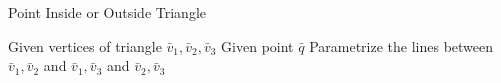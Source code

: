 \documentclass[a4paper,10pt]{scrartcl}
\begin{document}
    
\begin{algorithm}
  \caption{Point Inside or Outside Triangle}\label{}
  \begin{algorithmic}

    \State Given vertices of triangle $\bar v_1, \bar v_2, \bar v_3$
    \State Given point $\bar q$
    \State Parametrize the lines between $\bar v_1, \bar v_2$ and $\bar v_1, \bar v_3$ and $\bar v_2, \bar v_3$
  
  
  \end{algorithmic}
\end{algorithm}
\end{document}
